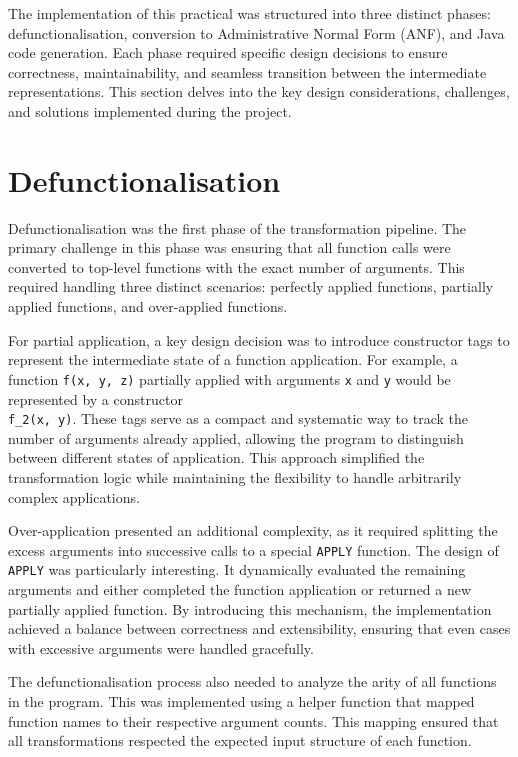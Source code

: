 \label{chapter:design-and-impl}

The implementation of this practical was structured into three distinct phases: defunctionalisation, conversion to Administrative Normal Form (ANF), and Java code generation. Each phase required specific design decisions to ensure correctness, maintainability, and seamless transition between the intermediate representations. This section delves into the key design considerations, challenges, and solutions implemented during the project.


\section{Defunctionalisation}
Defunctionalisation was the first phase of the transformation pipeline. The primary challenge in this phase was ensuring that all function calls were converted to top-level functions with the exact number of arguments. This required handling three distinct scenarios: perfectly applied functions, partially applied functions, and over-applied functions.

For partial application, a key design decision was to introduce constructor tags to represent the intermediate state of a function application. For example, a function \texttt{f(x, y, z)} partially applied with arguments \texttt{x} and \texttt{y} would be represented by a constructor\\ \texttt{f\_2(x, y)}. These tags serve as a compact and systematic way to track the number of arguments already applied, allowing the program to distinguish between different states of application. This approach simplified the transformation logic while maintaining the flexibility to handle arbitrarily complex applications.

Over-application presented an additional complexity, as it required splitting the excess arguments into successive calls to a special \texttt{APPLY} function. The design of \texttt{APPLY} was particularly interesting. It dynamically evaluated the remaining arguments and either completed the function application or returned a new partially applied function. By introducing this mechanism, the implementation achieved a balance between correctness and extensibility, ensuring that even cases with excessive arguments were handled gracefully.

The defunctionalisation process also needed to analyze the arity of all functions in the program. This was implemented using a helper function that mapped function names to their respective argument counts. This mapping ensured that all transformations respected the expected input structure of each function.

